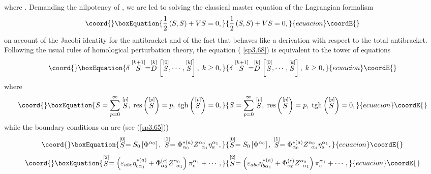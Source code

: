 \documentclass[a4paper,12pt]{article}
\begin{document}
where \coordHE{}. Demanding the nilpotency of \coordHE{}, we are led to solving the
classical master equation of the Lagrangian \coordHE{} formalism 
\begin{equation}\coord{}\boxEquation{
\frac{1}{2}\left( S,S\right) +VS=0,  \label{sp3.68}
}{
\frac{1}{2}\left( S,S\right) +VS=0,  }{ecuacion}\coordE{}\end{equation}
on account of the Jacobi identity for the antibracket and of the fact that \coordHE{} behaves like a derivation with respect to the total antibracket.
Following the usual rules of homological perturbation theory, the equation (%
\ref{sp3.68}) is equivalent to the tower of equations 
\begin{equation}\coord{}\boxEquation{
\delta \stackrel{[k+1]}{S}=\stackrel{[k]}{D}\left[ \stackrel{[0]}{S},\cdots ,
\stackrel{[k]}{S}\right] ,\;k\geq 0,  \label{sp3.69}
}{
\delta \stackrel{[k+1]}{S}=\stackrel{[k]}{D}\left[ \stackrel{[0]}{S},\cdots ,
\stackrel{[k]}{S}\right] ,\;k\geq 0,  }{ecuacion}\coordE{}\end{equation}
where 
\begin{equation}\coord{}\boxEquation{
S=\sum\limits_{p=0}^{\infty }\stackrel{[p]}{S},\;\mathrm{res}\left( 
\stackrel{[p]}{S}\right) =p,\;\mathrm{tgh}\left( \stackrel{[p]}{S}\right) =0,
\label{sp3.70}
}{
S=\sum\limits_{p=0}^{\infty }\stackrel{[p]}{S},\;\mathrm{res}\left( 
\stackrel{[p]}{S}\right) =p,\;\mathrm{tgh}\left( \stackrel{[p]}{S}\right) =0,
}{ecuacion}\coordE{}\end{equation}
while the boundary conditions on \coordHE{} are (see (\ref{sp3.65})) 
\begin{equation}\coord{}\boxEquation{
\stackrel{\lbrack 0]}{S}=S_{0}\left[ \Phi ^{\alpha _{0}}\right] ,\;\stackrel{
[1]}{S}=\Phi _{\alpha _{0}}^{*(a)}Z_{\;\;\alpha _{1}}^{\alpha _{0}}\eta
_{a}^{\alpha _{1}},  \label{sp3.71}
}{
\stackrel{\lbrack 0]}{S}=S_{0}\left[ \Phi ^{\alpha _{0}}\right] ,\;\stackrel{
[1]}{S}=\Phi _{\alpha _{0}}^{*(a)}Z_{\;\;\alpha _{1}}^{\alpha _{0}}\eta
_{a}^{\alpha _{1}},  }{ecuacion}\coordE{}\end{equation}
\begin{equation}\coord{}\boxEquation{
\stackrel{\lbrack 2]}{S}=\left( \varepsilon _{abc}\eta _{b\alpha
_{1}}^{*(a)}+\bar{\Phi}_{\alpha _{0}}^{(c)}Z_{\;\;\alpha _{1}}^{\alpha
_{0}}\right) \pi _{c}^{\alpha _{1}}+\cdots ,  \label{sp3.72}
}{
\stackrel{\lbrack 2]}{S}=\left( \varepsilon _{abc}\eta _{b\alpha
_{1}}^{*(a)}+\bar{\Phi}_{\alpha _{0}}^{(c)}Z_{\;\;\alpha _{1}}^{\alpha
_{0}}\right) \pi _{c}^{\alpha _{1}}+\cdots ,  }{ecuacion}\coordE{}\end{equation}
\end{document}
